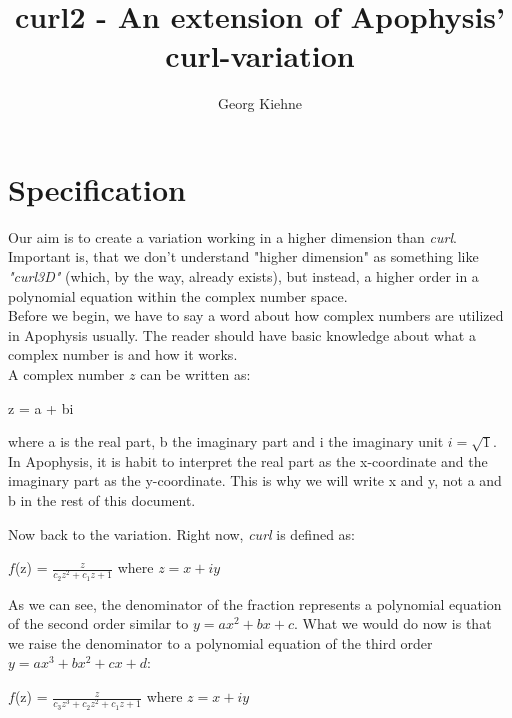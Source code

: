 \documentclass[]{article}
\title{curl2 - An extension of Apophysis' curl-variation}
\author{Georg Kiehne}
\begin{document}
\maketitle

\section{Specification}
	
\noindent Our aim is to create a variation working in a higher dimension than \emph{curl}. Important is, that we don't understand "higher dimension" as something like \emph{"curl3D"} (which, by the way, already exists), but instead, a higher order in a polynomial equation within the complex number space. \\

\noindent Before we begin, we have to say a word about how complex numbers are utilized in Apophysis usually. The reader should have basic knowledge about what a complex number is and how it works. \\

\noindent A complex number $z$ can be written as:

\begin{flushleft}
	\hspace{20pt} z = a + bi
\end{flushleft}

\noindent where a is the real part, b the imaginary part and i the imaginary unit $i = \sqrt{1}$. \\

\noindent  In Apophysis, it is habit to interpret the real part as the x-coordinate and the imaginary part as the y-coordinate. This is why we will write x and y, not a and b in the rest of this document.

\noindent Now back to the variation. Right now, \emph{curl} is defined as:

\begin{flushleft}
	\hspace{20pt} $f$(z) = $\frac{z}{c_2z^2 + c_1z + 1}$ where $z = x + iy$
\end{flushleft}

\noindent As we can see, the denominator of the fraction represents a polynomial equation of the second order similar to $y = ax^2 + bx + c$. What we would do now is that we raise the denominator to a polynomial equation of the third order $y = ax^3 + bx^2 + cx + d$:

\begin{flushleft}
	\hspace{20pt} $f$(z) = $\frac{z}{c_3z^3 + c_2z^2 + c_1z + 1}$ where $z = x + iy$
\end{flushleft}
\end{document}
